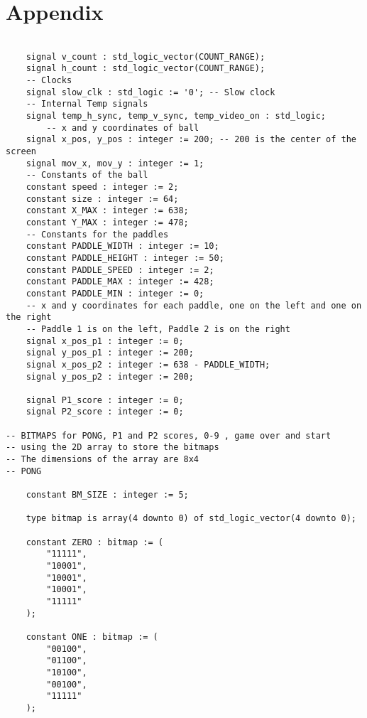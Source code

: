 \documentclass{article}
\begin{document}
\section*{Appendix}
\begin{lstlisting}[caption=Constants and Signals, label=lst:constants-signals]

    signal v_count : std_logic_vector(COUNT_RANGE);
    signal h_count : std_logic_vector(COUNT_RANGE);
    -- Clocks
    signal slow_clk : std_logic := '0'; -- Slow clock
    -- Internal Temp signals
    signal temp_h_sync, temp_v_sync, temp_video_on : std_logic;
		-- x and y coordinates of ball
    signal x_pos, y_pos : integer := 200; -- 200 is the center of the screen
    signal mov_x, mov_y : integer := 1;
    -- Constants of the ball
    constant speed : integer := 2;
    constant size : integer := 64;
    constant X_MAX : integer := 638;
    constant Y_MAX : integer := 478;
    -- Constants for the paddles
    constant PADDLE_WIDTH : integer := 10;
    constant PADDLE_HEIGHT : integer := 50;
    constant PADDLE_SPEED : integer := 2;
    constant PADDLE_MAX : integer := 428;
    constant PADDLE_MIN : integer := 0;
    -- x and y coordinates for each paddle, one on the left and one on the right
    -- Paddle 1 is on the left, Paddle 2 is on the right
    signal x_pos_p1 : integer := 0;
    signal y_pos_p1 : integer := 200;
    signal x_pos_p2 : integer := 638 - PADDLE_WIDTH;
    signal y_pos_p2 : integer := 200;

    signal P1_score : integer := 0;
    signal P2_score : integer := 0;

-- BITMAPS for PONG, P1 and P2 scores, 0-9 , game over and start
-- using the 2D array to store the bitmaps
-- The dimensions of the array are 8x4
-- PONG

    constant BM_SIZE : integer := 5;

    type bitmap is array(4 downto 0) of std_logic_vector(4 downto 0);
    
    constant ZERO : bitmap := (
        "11111",
        "10001",
        "10001",
        "10001",
        "11111"
    );

    constant ONE : bitmap := (
        "00100",
        "01100",
        "10100",
        "00100",
        "11111"
    );


\end{lstlisting}
\end{document}
